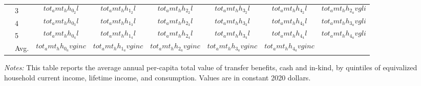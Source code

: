 \begin{table}[t]
\begin{tabular*}{\textwidth}{@{\extracolsep{\fill}}llcccccc@{}}
                                      & 3 & $$tot_amt_hh_0_2l$$ & $$tot_amt_hh_1_2l$$ & $$tot_amt_hh_2_2l$$ & $$tot_amt_hh_3_2l$$ & $$tot_amt_hh_4_2l$$ & $$tot_amt_hh_2_avgli$$\\
                                      & 4 & $$tot_amt_hh_0_3l$$ & $$tot_amt_hh_1_3l$$ & $$tot_amt_hh_2_3l$$ & $$tot_amt_hh_3_3l$$ & $$tot_amt_hh_4_3l$$ & $$tot_amt_hh_3_avgli$$\\
                                      & 5 & $$tot_amt_hh_0_4l$$ & $$tot_amt_hh_1_4l$$ & $$tot_amt_hh_2_4l$$ & $$tot_amt_hh_3_4l$$ & $$tot_amt_hh_4_4l$$  & $$tot_amt_hh_4_avgli$$\\ 
                                      & Avg. & $$tot_amt_hh_0_avginc$$ & $$tot_amt_hh_1_avginc$$ & $$tot_amt_hh_2_avginc$$ & $$tot_amt_hh_3_avginc$$ & $$tot_amt_hh_4_avginc$$ \\\bottomrule
\end{tabular*}
            \begin{spacing}{1}
\begin{tablenotes}
       \item \footnotesize \textit{Notes:} This table reports the average annual per-capita total value of transfer benefits, cash and in-kind, by quintiles of equivalized household current income, lifetime income, and consumption. Values are in constant 2020 dollars.
      \end{tablenotes}
       \end{spacing}
\end{table}
    
